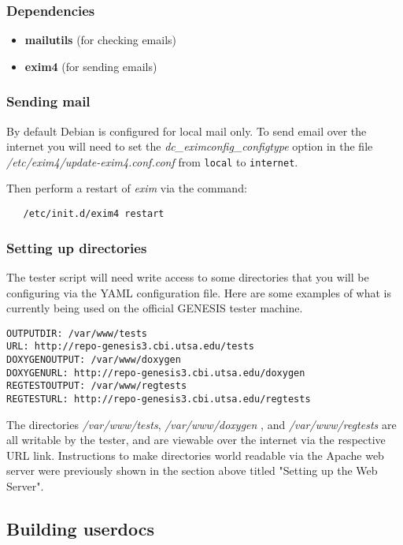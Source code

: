 \documentclass[12pt]{article}
\begin{document}
\subsubsection*{Dependencies}
\begin{itemize}
\item[]{\bf mailutils} (for checking emails)
\item[]{\bf exim4} (for sending emails)
\end{itemize}

\subsubsection*{Sending mail}

By default Debian is configured for local mail only. To send email over the internet you will need to set the {\it dc\_eximconfig\_configtype} option in the file {\it /etc/exim4/update-exim4.conf.conf} from {\tt local} to {\tt internet}.

Then perform a restart of {\it exim} via the command:
\begin{verbatim}
   /etc/init.d/exim4 restart
\end{verbatim}

\subsubsection*{Setting up directories}

The tester script will need write access to some directories that you will be configuring via the YAML configuration file. Here are some examples of what is currently being used on the official GENESIS tester machine. 

\begin{verbatim}
OUTPUTDIR: /var/www/tests
URL: http://repo-genesis3.cbi.utsa.edu/tests
DOXYGENOUTPUT: /var/www/doxygen
DOXYGENURL: http://repo-genesis3.cbi.utsa.edu/doxygen
REGTESTOUTPUT: /var/www/regtests
REGTESTURL: http://repo-genesis3.cbi.utsa.edu/regtests
\end{verbatim}

The directories {\it /var/www/tests}, {\it /var/www/doxygen} , and {\it /var/www/regtests} are all writable by the tester, and are viewable over the internet via the respective URL link. Instructions to make directories world readable via the Apache web server were previously shown in the section above titled "Setting up the Web Server". 

\subsection*{Building userdocs}
\end{document}
